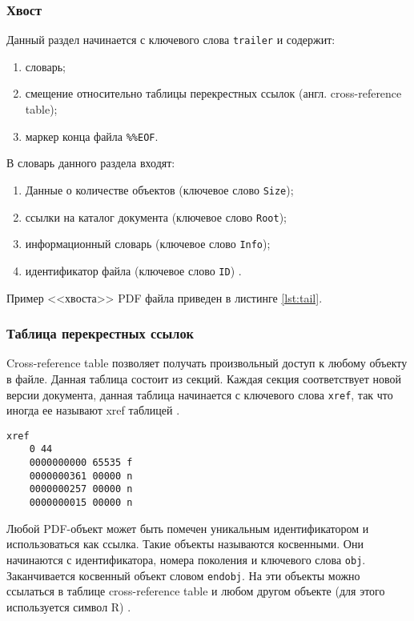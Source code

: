 \subsubsection{Хвост}
Данный раздел начинается с ключевого слова \texttt{trailer} и содержит:
\begin{enumerate}
	\item словарь;
	\item смещение относительно таблицы  перекрестных ссылок (англ. cross-reference table);
	\item маркер конца файла \texttt{\%\%EOF}.
\end{enumerate}
В словарь данного раздела входят:
\begin{enumerate}
	\item Данные о количестве объектов (ключевое слово \texttt{Size});
	\item ссылки на каталог документа (ключевое слово \texttt{Root});
	\item информационный словарь (ключевое слово \texttt{Info});
	\item идентификатор файла (ключевое слово \texttt{ID}) \cite{pdf_object_def}.
\end{enumerate}
Пример <<хвоста>> PDF файла приведен в листинге \ref{lst:tail}.






\subsubsection{Таблица  перекрестных ссылок}
Cross-reference table позволяет получать произвольный доступ к любому объекту в файле. Данная таблица состоит из секций. Каждая секция соответствует  новой версии документа, данная таблица начинается с ключевого слова \texttt{xref}, так что иногда ее называют xref таблицей \cite{pdf_structure_trans}.

\begin{lstlisting}[label=lst:xref,caption=Пример таблицы перекрестных ссылок]
xref
	0 44
	0000000000 65535 f 
	0000000361 00000 n 
	0000000257 00000 n 
	0000000015 00000 n 
\end{lstlisting}






Любой PDF-объект может быть помечен уникальным идентификатором и использоваться как ссылка. Такие объекты называются косвенными. Они начинаются с идентификатора, номера поколения и ключевого слова \texttt{obj}. Заканчивается косвенный объект словом \texttt{endobj}. На эти объекты можно ссылаться в таблице 
cross-reference table и любом другом объекте (для этого используется символ R) \cite{pdf_structure_trans}. 



